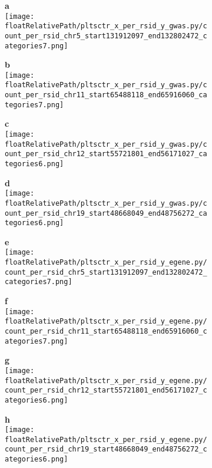 \begin{figure}[!tbp]

\begin{subfigure}[]{.24\textwidth}
\textbf{a}
\\
\texttt{[image: \\floatRelativePath/pltsctr\_x\_per\_rsid\_y\_gwas.py/count\_per\_rsid\_chr5\_start131912097\_end132802472\_categories7.png]}
\end{subfigure}
%
\begin{subfigure}[]{.24\textwidth}
\textbf{b}
\\
\texttt{[image: \\floatRelativePath/pltsctr\_x\_per\_rsid\_y\_gwas.py/count\_per\_rsid\_chr11\_start65488118\_end65916060\_categories7.png]}
\end{subfigure}
%
\begin{subfigure}[]{.24\textwidth}
\textbf{c}
\\
\texttt{[image: \\floatRelativePath/pltsctr\_x\_per\_rsid\_y\_gwas.py/count\_per\_rsid\_chr12\_start55721801\_end56171027\_categories6.png]}
\end{subfigure}
%
\begin{subfigure}[]{.24\textwidth}
\textbf{d}
\\
\texttt{[image: \\floatRelativePath/pltsctr\_x\_per\_rsid\_y\_gwas.py/count\_per\_rsid\_chr19\_start48668049\_end48756272\_categories6.png]}
\end{subfigure}

\begin{subfigure}[]{.24\textwidth}
\textbf{e}
\\
\texttt{[image: \\floatRelativePath/pltsctr\_x\_per\_rsid\_y\_egene.py/count\_per\_rsid\_chr5\_start131912097\_end132802472\_categories7.png]}
\end{subfigure}
%
\begin{subfigure}[]{.24\textwidth}
\textbf{f}
\\
\texttt{[image: \\floatRelativePath/pltsctr\_x\_per\_rsid\_y\_egene.py/count\_per\_rsid\_chr11\_start65488118\_end65916060\_categories7.png]}
\end{subfigure}
%
\begin{subfigure}[]{.24\textwidth}
\textbf{g}
\\
\texttt{[image: \\floatRelativePath/pltsctr\_x\_per\_rsid\_y\_egene.py/count\_per\_rsid\_chr12\_start55721801\_end56171027\_categories6.png]}
\end{subfigure}
%
\begin{subfigure}[]{.24\textwidth}
\textbf{h}
\\
\texttt{[image: \\floatRelativePath/pltsctr\_x\_per\_rsid\_y\_egene.py/count\_per\_rsid\_chr19\_start48668049\_end48756272\_categories6.png]}
\end{subfigure}


\end{figure}
